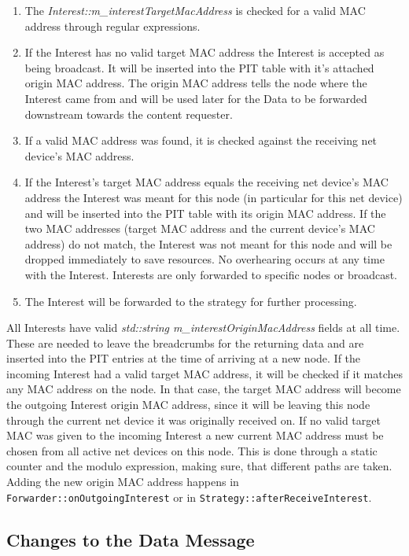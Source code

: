 \begin{enumerate}
\item The \emph{Interest::m\_interestTargetMacAddress} is checked for a valid MAC address through regular expressions.
\item If the Interest has no valid target MAC address the Interest is accepted as being broadcast. It will be inserted into the PIT table with it's attached origin MAC address. The origin MAC address tells the node where the Interest came from and will be used later for the Data to be forwarded downstream towards the content requester.
\item If a valid MAC address was found, it is checked against the receiving net device's MAC address.
\item If the Interest's target MAC address equals the receiving net device's MAC address the Interest was meant for this node (in particular for this net device) and will be inserted into the PIT table with its origin MAC address. If the two MAC addresses (target MAC address and the current device's MAC address) do not match, the Interest was not meant for this node and will be dropped immediately to save resources. No overhearing occurs at any time with the Interest. Interests are only forwarded to specific nodes or broadcast.
\item The Interest will be forwarded to the strategy for further processing.
\end{enumerate}

All Interests have valid \emph{std::string m\_interestOriginMacAddress} fields at all time. These are needed to leave the breadcrumbs for the returning data and are inserted into the PIT entries at the time of arriving at a new node. If the incoming Interest had a valid target MAC address, it will be checked if it matches any MAC address on the node. In that case, the target MAC address will become the outgoing Interest origin MAC address, since it will be leaving this node through the current net device it was originally received on. If no valid target MAC was given to the incoming Interest a new current MAC address must be chosen from all active net devices on this node. This is done through a static counter and the modulo expression, making sure, that different paths are taken. Adding the new origin MAC address happens in \texttt{Forwarder::onOutgoingInterest} or in \texttt{Strategy::afterReceiveInterest}.

\subsection{Changes to the Data Message}

